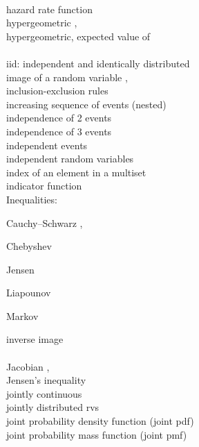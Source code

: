 \documentclass[12pt]{article}
\begin{document}
\\
\noindent hazard rate function \pageref{hazardratefunction}\\
\noindent hypergeometric \pageref{hypergeometric1}, \pageref{d:hypergeom}\\
\noindent hypergeometric, expected value of \pageref{expectedvalueofhypergeometric}\\

\\
\noindent iid: independent and identically distributed \pageref{iiddef}\\
\noindent image of a random variable \pageref{d:imageofrv},\pageref{f:imagepreimage}\\
\noindent inclusion-exclusion rules \pageref{inclusionexclusionrules}\\
\noindent increasing sequence of events (nested) \pageref{nestedincreasing}\\
\noindent independence of 2 events \pageref{d:2eventsindependent}\\
\noindent independence of 3 events \pageref{d:3eventsindependent}\\
\noindent independent events \pageref{d:independentevents}\\
\noindent independent random variables \pageref{independentrvs}\\
\noindent index of an element in a multiset \pageref{d:index}\\
\noindent indicator function \pageref{indicatorfunction}\\
\noindent Inequalities:

\noindent \quad Cauchy--Schwarz \pageref{cauchyschwarz}, \pageref{cauchyschwarz2}

\noindent \quad Chebyshev \pageref{chebyshevinequality}

\noindent \quad Jensen \pageref{jenseninequality}

\noindent \quad Liapounov \pageref{liapounov}

\noindent \quad Markov \pageref{markovinequality}

\noindent inverse image \pageref{d:inverseimage}\\

\\
\noindent Jacobian \pageref{jacobian},\ \pageref{jacobian2}\\
\noindent Jensen's inequality \pageref{jenseninequality}\\
\noindent jointly continuous \pageref{jointlycontinuous}\\
\noindent jointly distributed rvs \pageref{jointlydistributed}\\
\noindent joint probability density function (joint pdf) \pageref{jointpdf}\\
\noindent joint probability mass function (joint pmf) \label{jointpmf}\\
\end{document}
